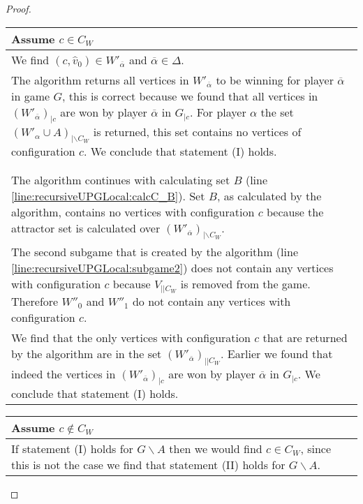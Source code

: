 \begin{theorem}
\begin{proof}
		\begin{longtable}{|p{14.2cm}}
			Assume $c \in C_W$\\
			\hline
			We find $(c,\hat{v}_0) \in W'_{\overline{\alpha}}$ and $\overline{\alpha} \in \Delta$.
			
			\begin{tabular}{|p{14cm}}
				Assume $(W'_{\overline{\alpha}})_{|\backslash C_W} = \emptyset$ (line \ref{line:recursiveUPGLocal:wopponentwithoutCWisempty})\\
				\hline
				The algorithm returns all vertices in $W'_{\overline{\alpha}}$ to be winning for player $\overline{\alpha}$ in game $G$, this is correct because we found that all vertices in $(W'_{\overline{\alpha}})_{|c}$ are won by player $\overline{\alpha}$ in $G_{|c}$. For player $\alpha$ the set $(W'_\alpha \cup A)_{|\backslash C_W}$ is returned, this set contains no vertices of configuration $c$. We conclude that statement (I) holds.
			\end{tabular}\\\\
			\begin{tabular}{|p{14cm}}
				Assume $(W'_{\overline{\alpha}})_{|\backslash C_W} \neq \emptyset$ (line \ref{line:recursiveUPGLocal:wopponentwithoutCWisempty})\\
				\hline
				The algorithm continues with calculating set $B$ (line \ref{line:recursiveUPGLocal:calcC_B}). Set $B$, as calculated by the algorithm, contains no vertices with configuration $c$ because the attractor set is calculated over $(W'_{\overline{\alpha}})_{|\backslash C_W}$.\\
				The second subgame that is created by the algorithm (line \ref{line:recursiveUPGLocal:subgame2}) does not contain any vertices with configuration $c$ because $V_{||C_W}$ is removed from the game. Therefore $W''_0$ and $W''_1$ do not contain any vertices with configuration $c$.\\
				We find that the only vertices with configuration $c$ that are returned by the algorithm are in the set $(W'_{\overline{\alpha}})_{||C_W}$. Earlier we found that indeed the vertices in $(W'_{\overline{\alpha}})_{|c}$ are won by player $\overline{\alpha}$ in $G_{|c}$. We conclude that statement (I) holds.
			\end{tabular}
		\end{longtable}
		\begin{longtable}{|p{14.2cm}}
			Assume $c \notin C_W$\\
			\hline
			If statement (I) holds for $G\backslash A$ then we would find $c \in C_W$, since this is not the case we find that statement (II) holds for $G\backslash A$.
			

\end{longtable}
\end{proof}
\end{theorem}
